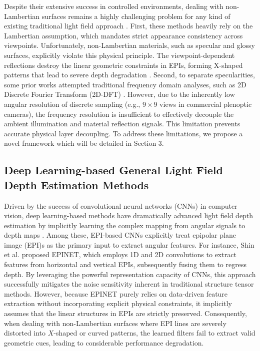 \documentclass[lettersize,journal]{IEEEtran}
\begin{document}
Despite their extensive success in controlled environments, dealing with non-Lambertian surfaces remains a highly challenging problem for any kind of existing traditional light field approach \cite{nonnon_22}. First, these methods heavily rely on the Lambertian assumption, which mandates strict appearance consistency across viewpoints. Unfortunately, non-Lambertian materials, such as specular and glossy surfaces, explicitly violate this physical principle. The viewpoint-dependent reflections destroy the linear geometric constraints in EPIs, forming X-shaped patterns that lead to severe depth degradation \cite{xx}. Second, to separate specularities, some prior works attempted traditional frequency domain analyses, such as 2D Discrete Fourier Transform (2D-DFT) \cite{dd}. However, due to the inherently low angular resolution of discrete sampling (e.g., $9 \times 9$ views in commercial plenoptic cameras), the frequency resolution is insufficient to effectively decouple the ambient illumination and material reflection signals. This limitation prevents accurate physical layer decoupling. To address these limitations, we propose a novel framework which will be detailed in Section 3.

\subsection{Deep Learning-based General Light Field Depth Estimation Methods}

Driven by the success of convolutional neural networks (CNNs) in computer vision, deep learning-based methods have dramatically advanced light field depth estimation by implicitly learning the complex mapping from angular signals to depth maps \cite{deepdeep}. Among these, EPI-based CNNs explicitly treat epipolar plane image (EPI)s as the primary input to extract angular features. For instance, Shin et al. \cite{shinshin} proposed EPINET, which employs 1D and 2D convolutions to extract features from horizontal and vertical EPIs, subsequently fusing them to regress depth. By leveraging the powerful representation capacity of CNNs, this approach successfully mitigates the noise sensitivity inherent in traditional structure tensor methods. However, because EPINET purely relies on data-driven feature extraction without incorporating explicit physical constraints, it implicitly assumes that the linear structures in EPIs are strictly preserved. Consequently, when dealing with non-Lambertian surfaces where EPI lines are severely distorted into $X$-shaped or curved patterns, the learned filters fail to extract valid geometric cues, leading to considerable performance degradation.
\end{document}
